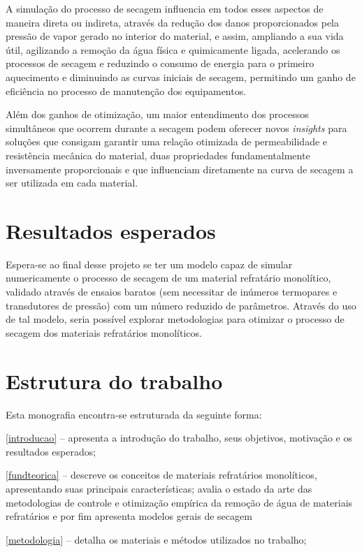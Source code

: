   A simulação do processo de secagem influencia em todos esses aspectos de
   maneira direta ou indireta, através da redução dos danos proporcionados pela
   pressão de vapor gerado no interior do material, e assim, ampliando a sua
   vida útil, agilizando a remoção da água física e quimicamente ligada,
   acelerando os processos de secagem e reduzindo o consumo de energia para o
   primeiro aquecimento e diminuindo as curvas iniciais de secagem, permitindo
   um ganho de eficiência no processo de manutenção dos equipamentos.

   Além dos ganhos de otimização, um maior entendimento dos processos
   simultâneos que ocorrem durante a secagem podem oferecer novos
   \textit{insights} para soluções que consigam garantir uma relação otimizada
   de permeabilidade e resistência mecânica do material, duas propriedades
   fundamentalmente inversamente proporcionais e que influenciam diretamente na
   curva de secagem a ser utilizada em cada material.


   \section{Resultados esperados} \label{results-esperados} Espera-se ao final
   desse projeto se ter um modelo capaz de simular numericamente o processo de
   secagem de um material refratário monolítico, validado através de ensaios
   baratos (sem necessitar de inúmeros termopares e transdutores de pressão) com
   um número reduzido de parâmetros. Através do uso de tal modelo, seria
   possível explorar metodologias para otimizar o processo de secagem dos
   materiais refratários monolíticos.

    
\section{Estrutura do trabalho}
    
Esta monografia encontra-se estruturada da seguinte forma:
    
\autoref{introducao} – apresenta a introdução do trabalho, seus objetivos, motivação e os resultados esperados;
    
\autoref{fundteorica} – descreve os conceitos de materiais refratários
monolíticos, apresentando suas principais características; avalia o estado da
arte das metodologias de controle e otimização empírica da remoção de água de
materiais refratários e por fim apresenta modelos gerais de secagem
    
\autoref{metodologia} – detalha os materiais e métodos utilizados no trabalho;
    
